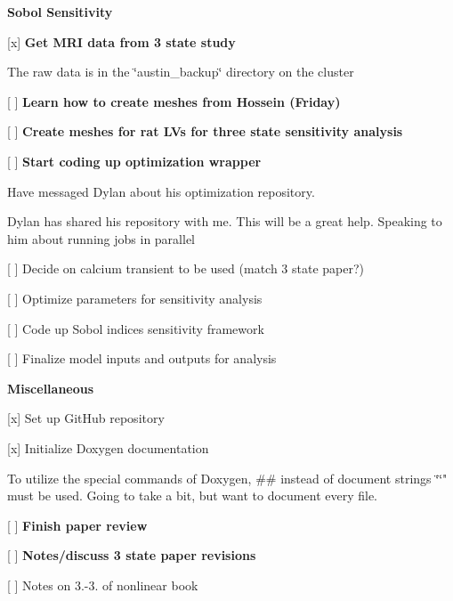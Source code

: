 {\bfseries{Sobol Sensitivity}}
\begin{DoxyItemize}
\item \mbox{[}x\mbox{]} {\bfseries{Get M\+RI data from 3 state study}}
\begin{DoxyItemize}
\item The raw data is in the \char`\"{}austin\+\_\+backup\char`\"{} directory on the cluster
\end{DoxyItemize}
\item \mbox{[} \mbox{]} {\bfseries{Learn how to create meshes from Hossein (Friday)}}
\item \mbox{[} \mbox{]} {\bfseries{Create meshes for rat LV\textquotesingle{}s for three state sensitivity analysis}}
\item \mbox{[} \mbox{]} {\bfseries{Start coding up optimization wrapper}}
\begin{DoxyItemize}
\item Have messaged Dylan about his optimization repository.
\item Dylan has shared his repository with me. This will be a great help. Speaking to him about running jobs in parallel
\end{DoxyItemize}
\item \mbox{[} \mbox{]} Decide on calcium transient to be used (match 3 state paper?)
\item \mbox{[} \mbox{]} Optimize parameters for sensitivity analysis
\item \mbox{[} \mbox{]} Code up Sobol\textquotesingle{} indices sensitivity framework
\item \mbox{[} \mbox{]} Finalize model inputs and outputs for analysis ~\newline

\end{DoxyItemize}

{\bfseries{Miscellaneous}}
\begin{DoxyItemize}
\item \mbox{[}x\mbox{]} Set up Git\+Hub repository
\item \mbox{[}x\mbox{]} Initialize Doxygen documentation
\begin{DoxyItemize}
\item To utilize the special commands of Doxygen, \#\# instead of document strings \char`\"{}\char`\"{}" must be used. Going to take a bit, but want to document every file.
\end{DoxyItemize}
\item \mbox{[} \mbox{]} {\bfseries{Finish paper review}}
\item \mbox{[} \mbox{]} {\bfseries{Notes/discuss 3 state paper revisions}}
\item \mbox{[} \mbox{]} Notes on 3.-\/3. of nonlinear book ~\newline

\end{DoxyItemize}

